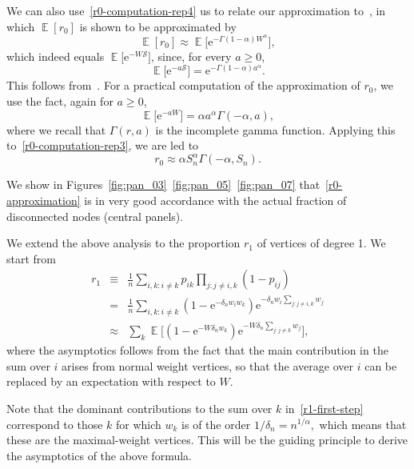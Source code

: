 \documentclass[ twocolumn,
 amsmath,amssymb,
 aps, pre, amsthm, amsfonts,
]{revtex4-2}
\DeclareMathOperator{\EX}{\mathbb{E}}%
\newcommand{\e}{\mathrm{e}}
\newcommand{\nn}{\nonumber}
\begin{document}
We can also use~\eqref{r0-computation-rep4} us to relate our approximation to~\cite[Proposition 4]{avena2022inhomogeneous}, in which $\EX[r_0]$ is shown to be approximated by
    \begin{equation}
    \EX[r_{0}]
    \approx \EX\Big[\e^{- \Gamma(1-\alpha)W^\alpha} \Big],
    \end{equation}
which indeed equals $\EX\big[\e^{- W \mathcal{S}}\big]$, since, for every $a\geq 0$,
    \begin{equation}
    \EX\Big[\e^{- a \mathcal{S}}\Big]
    =\e^{- \Gamma(1-\alpha)a^\alpha}.
    \end{equation}
This follows from~\cite[Theorem 5]{avena2022inhomogeneous}. For a practical computation of the approximation of $r_0$, we use the fact, again for $a\geq 0$,
    \begin{equation}
    \label{MGF-Pareto}
    \EX\big[\e^{- a W}\big]
    =\alpha a^{\alpha} \Gamma(-\alpha, a),
    \end{equation}
where we recall that $\Gamma(r, a)$ is the incomplete gamma function. Applying this to~\eqref{r0-computation-rep3}, we are led to
\begin{equation}
\label{r0-approximation}
    r_{0}
    \approx \alpha S_n^\alpha \Gamma(-\alpha, S_n).
\end{equation}

We show in Figures~\ref{fig:pan_03}~\ref{fig:pan_05}~\ref{fig:pan_07} that~\eqref{r0-approximation} is in very good accordance with the actual fraction of disconnected nodes (central panels). 


We extend the above analysis to the proportion $r_1$ of vertices of degree 1. We start from
\begin{eqnarray}
\label{r1-first-step}
    r_{1} &\equiv& \frac{1}{n}\sum_{i,k\colon i\neq k} p_{ik} \prod_{j\colon j\neq i,k} (1-p_{ij})\\
    &=& \frac{1}{n}\sum_{i,k\colon i\neq k}
    (1-\e^{-\delta_n w_iw_k})
    \e^{-\delta_n w_i \sum_{j\colon j\neq i, k} w_j}\nn\\
    &\approx & \sum_{k}
    \EX\Big[(1-\e^{- W \delta_n w_k})
    \e^{-W \delta_n\sum_{j\colon j\neq k} w_j}\Big],\nn
\end{eqnarray}
where the asymptotics follows from the fact that the main contribution in the sum over $i$ arises from normal weight vertices, so that the average over $i$ can be replaced by an expectation with respect to $W$.
\smallskip


Note that the dominant contributions to the sum over $k$ in~\eqref{r1-first-step} correspond to those $k$ for which $w_k$ is of the order $1/\delta_n=n^{1/\alpha},$ which means that these are the maximal-weight vertices. This will be the guiding principle to derive the asymptotics of the above formula.
\smallskip
\end{document}
